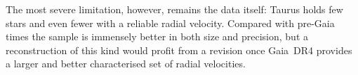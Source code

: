 The most severe limitation, however, remains the data itself: Taurus holds few stars and even fewer with a
reliable radial velocity. Compared with pre-Gaia times the sample is immensely better in
both size and precision, but a reconstruction of this kind would profit from a revision once
Gaia~DR4 \citep{GaiaDR4}
provides a larger and better characterised set of radial velocities.